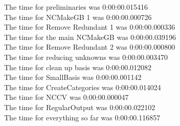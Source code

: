 \documentclass[rep10,leqno]{report}
\begin{document}
\noindent
The time for preliminaries was 0:00:00.015416\\
The time for NCMakeGB 1 was 0:00:00.000726\\
The time for Remove Redundant 1 was 0:00:00.000336\\
The time for the main NCMakeGB was 0:00:00.039196\\
The time for Remove Redundant 2 was 0:00:00.000800\\
The time for reducing unknowns was 0:00:00.003470\\
The time for clean up basis was 0:00:00.012082\\
The time for SmallBasis was 0:00:00.001142\\
The time for CreateCategories was 0:00:00.014024\\
The time for NCCV was 0:00:00.000047\\
The time for RegularOutput was 0:00:00.022102\\
The time for everything so far was 0:00:00.116857\\
\end{document}
